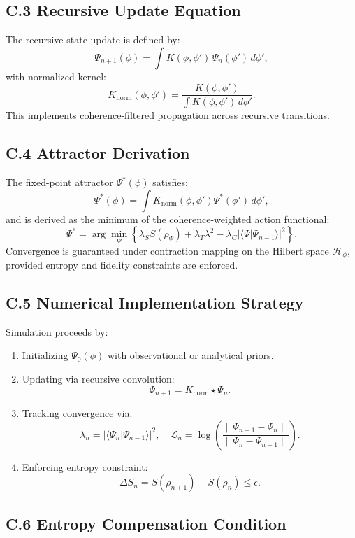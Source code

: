 \subsection*{C.3 Recursive Update Equation}

The recursive state update is defined by:
\[
\Psi_{n+1}(\phi) = \int K(\phi, \phi') \, \Psi_n(\phi') \, d\phi',
\]
with normalized kernel:
\[
K_{\text{norm}}(\phi, \phi') = \frac{K(\phi, \phi')}{\int K(\phi, \phi') \, d\phi'}.
\]
This implements coherence-filtered propagation across recursive transitions.

\subsection*{C.4 Attractor Derivation}

The fixed-point attractor \( \Psi^*(\phi) \) satisfies:
\[
\Psi^*(\phi) = \int K_{\text{norm}}(\phi, \phi') \Psi^*(\phi') \, d\phi',
\]
and is derived as the minimum of the coherence-weighted action functional:
\[
\Psi^* = \arg\min_{\Psi} \left\{
\lambda_S S(\rho_\Psi)
+ \lambda_T \lambda^2
- \lambda_C |\langle \Psi | \Psi_{n-1} \rangle|^2
\right\}.
\]
Convergence is guaranteed under contraction mapping on the Hilbert space \( \mathcal{H}_\phi \), provided entropy and fidelity constraints are enforced.

\subsection*{C.5 Numerical Implementation Strategy}

Simulation proceeds by:

\begin{enumerate}[leftmargin=1.5em]
  \item Initializing \( \Psi_0(\phi) \) with observational or analytical priors.
  \item Updating via recursive convolution:
  \[
  \Psi_{n+1} = K_{\text{norm}} \star \Psi_n.
  \]
  \item Tracking convergence via:
  \[
  \lambda_n = |\langle \Psi_n | \Psi_{n-1} \rangle|^2, \quad 
  \mathcal{L}_n = \log \left( \frac{\|\Psi_{n+1} - \Psi_n\|}{\|\Psi_n - \Psi_{n-1}\|} \right).
  \]
  \item Enforcing entropy constraint:
  \[
  \Delta S_n = S(\rho_{n+1}) - S(\rho_n) \leq \epsilon.
  \]
\end{enumerate}

\subsection*{C.6 Entropy Compensation Condition}


